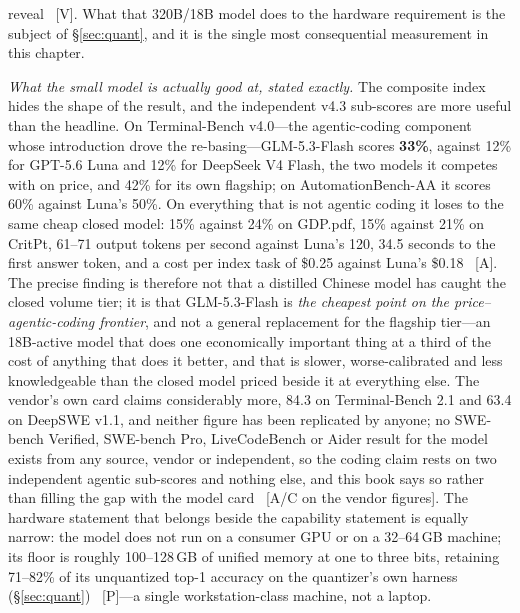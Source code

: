 reveal~\cite{glm53-flash,glm53-chips} [V]. What that 320B/18B model does to the hardware requirement is the subject of \S\ref{sec:quant}, and it is the single most consequential measurement in this chapter.

\emph{What the small model is actually good at, stated exactly.} The composite index hides the shape of the result, and the independent v4.3 sub-scores are more useful than the headline. On Terminal-Bench v4.0---the agentic-coding component whose introduction drove the re-basing---GLM-5.3-Flash scores \textbf{33\%}, against 12\% for GPT-5.6 Luna and 12\% for DeepSeek V4 Flash, the two models it competes with on price, and 42\% for its own flagship; on AutomationBench-AA it scores 60\% against Luna's 50\%. On everything that is not agentic coding it loses to the same cheap closed model: 15\% against 24\% on GDP.pdf, 15\% against 21\% on CritPt, 61--71 output tokens per second against Luna's 120, 34.5 seconds to the first answer token, and a cost per index task of \$0.25 against Luna's \$0.18~\cite{glm53-flash-agentic} [A]. The precise finding is therefore not that a distilled Chinese model has caught the closed volume tier; it is that GLM-5.3-Flash is \emph{the cheapest point on the price--agentic-coding frontier}, and not a general replacement for the flagship tier---an 18B-active model that does one economically important thing at a third of the cost of anything that does it better, and that is slower, worse-calibrated and less knowledgeable than the closed model priced beside it at everything else. The vendor's own card claims considerably more, 84.3 on Terminal-Bench 2.1 and 63.4 on DeepSWE v1.1, and neither figure has been replicated by anyone; no SWE-bench Verified, SWE-bench Pro, LiveCodeBench or Aider result for the model exists from any source, vendor or independent, so the coding claim rests on two independent agentic sub-scores and nothing else, and this book says so rather than filling the gap with the model card~\cite{glm53-flash-agentic} [A/C on the vendor figures]. The hardware statement that belongs beside the capability statement is equally narrow: the model does not run on a consumer GPU or on a 32--64\,GB machine; its floor is roughly 100--128\,GB of unified memory at one to three bits, retaining 71--82\% of its unquantized top-1 accuracy on the quantizer's own harness (\S\ref{sec:quant})~\cite{glm53-local} [P]---a single workstation-class machine, not a laptop.

